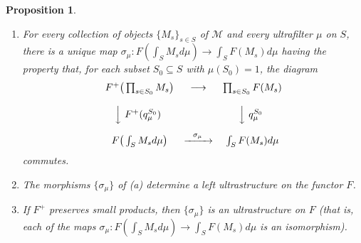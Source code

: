 \documentclass[11pt]{article}
\theoremstyle{plain}
\newtheorem{proposition}{Proposition}
\begin{document}
\begin{proposition}
\begin{enumerate}
\item[(a)] For every collection of objects $\{M_s\}_{s \in S}$ of $\mathcal{M}$ and every ultrafilter $\mu$
on $S$, there is a unique map $\sigma_\mu : F(\int_S M_s d\mu) \to \int_S F(M_s)d\mu$ having the property
that, for each subset $S_0 \subseteq S$ with $\mu(S_0) = 1$, the diagram
\[
\begin{array}{ccc}
F^+\big(\prod_{s \in S_0} M_s\big) & \longrightarrow & \prod_{s \in S_0} F(M_s)\\[12pt]
\Big\downarrow{\ F^+(q_\mu^{S_0})\ } & & \Big\downarrow{\ q_\mu^{S_0}\ }\\[12pt]
F\big(\int_S M_s d\mu\big) & \xrightarrow{\ \ \sigma_\mu\ \ } & \int_S F(M_s)d\mu
\end{array}
\]
commutes.
\item[(b)] The morphisms $\{\sigma_\mu\}$ of (a) determine a left ultrastructure on the functor $F$.
\item[(c)] If $F^+$ preserves small products, then $\{\sigma_\mu\}$ is an ultrastructure on $F$ (that is, each
of the maps $\sigma_\mu : F(\int_S M_s d\mu) \to \int_S F(M_s)d\mu$ is an isomorphism).
\end{enumerate}
\end{proposition}
\end{document}
